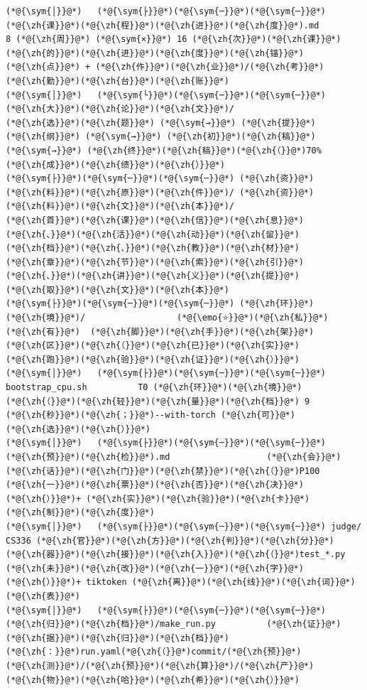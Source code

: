 \documentclass[
]{article}
\def\zh#1{{\zhfont #1}}
\def\sym#1{{\symfont #1}}
\def\emo#1{{\emofont #1}}
\begin{document}
\begin{lstlisting}
(*@{\sym{│}}@*)   (*@{\sym{├}}@*)(*@{\sym{─}}@*)(*@{\sym{─}}@*) (*@{\zh{课}}@*)(*@{\zh{程}}@*)(*@{\zh{进}}@*)(*@{\zh{度}}@*).md               8 (*@{\zh{周}}@*) (*@{\sym{×}}@*) 16 (*@{\zh{次}}@*)(*@{\zh{课}}@*)(*@{\zh{的}}@*)(*@{\zh{进}}@*)(*@{\zh{度}}@*)(*@{\zh{锚}}@*)(*@{\zh{点}}@*) + (*@{\zh{作}}@*)(*@{\zh{业}}@*)/(*@{\zh{考}}@*)(*@{\zh{勤}}@*)(*@{\zh{台}}@*)(*@{\zh{账}}@*)
(*@{\sym{│}}@*)   (*@{\sym{└}}@*)(*@{\sym{─}}@*)(*@{\sym{─}}@*) (*@{\zh{大}}@*)(*@{\zh{论}}@*)(*@{\zh{文}}@*)/                   (*@{\zh{选}}@*)(*@{\zh{题}}@*) (*@{\sym{→}}@*) (*@{\zh{提}}@*)(*@{\zh{纲}}@*) (*@{\sym{→}}@*) (*@{\zh{初}}@*)(*@{\zh{稿}}@*) (*@{\sym{→}}@*) (*@{\zh{终}}@*)(*@{\zh{稿}}@*)(*@{\zh{（}}@*)70% (*@{\zh{成}}@*)(*@{\zh{绩}}@*)(*@{\zh{）}}@*)
(*@{\sym{├}}@*)(*@{\sym{─}}@*)(*@{\sym{─}}@*) (*@{\zh{资}}@*)(*@{\zh{料}}@*)(*@{\zh{原}}@*)(*@{\zh{件}}@*)/ (*@{\zh{资}}@*)(*@{\zh{料}}@*)(*@{\zh{文}}@*)(*@{\zh{本}}@*)/           (*@{\zh{首}}@*)(*@{\zh{课}}@*)(*@{\zh{信}}@*)(*@{\zh{息}}@*)(*@{\zh{、}}@*)(*@{\zh{活}}@*)(*@{\zh{动}}@*)(*@{\zh{留}}@*)(*@{\zh{档}}@*)(*@{\zh{、}}@*)(*@{\zh{教}}@*)(*@{\zh{材}}@*)(*@{\zh{章}}@*)(*@{\zh{节}}@*)(*@{\zh{索}}@*)(*@{\zh{引}}@*)(*@{\zh{、}}@*)(*@{\zh{讲}}@*)(*@{\zh{义}}@*)(*@{\zh{提}}@*)(*@{\zh{取}}@*)(*@{\zh{文}}@*)(*@{\zh{本}}@*)
(*@{\sym{├}}@*)(*@{\sym{─}}@*)(*@{\sym{─}}@*) (*@{\zh{环}}@*)(*@{\zh{境}}@*)/                  (*@{\emo{⭐}}@*)(*@{\zh{私}}@*)(*@{\zh{有}}@*)  (*@{\zh{脚}}@*)(*@{\zh{手}}@*)(*@{\zh{架}}@*)(*@{\zh{区}}@*)(*@{\zh{（}}@*)(*@{\zh{已}}@*)(*@{\zh{实}}@*)(*@{\zh{跑}}@*)(*@{\zh{验}}@*)(*@{\zh{证}}@*)(*@{\zh{）}}@*)
(*@{\sym{│}}@*)   (*@{\sym{├}}@*)(*@{\sym{─}}@*)(*@{\sym{─}}@*) bootstrap_cpu.sh          T0 (*@{\zh{环}}@*)(*@{\zh{境}}@*)(*@{\zh{（}}@*)(*@{\zh{轻}}@*)(*@{\zh{量}}@*)(*@{\zh{档}}@*) 9 (*@{\zh{秒}}@*)(*@{\zh{；}}@*)--with-torch (*@{\zh{可}}@*)(*@{\zh{选}}@*)(*@{\zh{）}}@*)
(*@{\sym{│}}@*)   (*@{\sym{├}}@*)(*@{\sym{─}}@*)(*@{\sym{─}}@*) (*@{\zh{预}}@*)(*@{\zh{检}}@*).md                   (*@{\zh{会}}@*)(*@{\zh{话}}@*)(*@{\zh{门}}@*)(*@{\zh{禁}}@*)(*@{\zh{（}}@*)P100 (*@{\zh{一}}@*)(*@{\zh{票}}@*)(*@{\zh{否}}@*)(*@{\zh{决}}@*)(*@{\zh{）}}@*)+ (*@{\zh{实}}@*)(*@{\zh{验}}@*)(*@{\zh{卡}}@*)(*@{\zh{制}}@*)(*@{\zh{度}}@*)
(*@{\sym{│}}@*)   (*@{\sym{├}}@*)(*@{\sym{─}}@*)(*@{\sym{─}}@*) judge/                    CS336 (*@{\zh{官}}@*)(*@{\zh{方}}@*)(*@{\zh{判}}@*)(*@{\zh{分}}@*)(*@{\zh{器}}@*)(*@{\zh{接}}@*)(*@{\zh{入}}@*)(*@{\zh{（}}@*)test_*.py (*@{\zh{未}}@*)(*@{\zh{改}}@*)(*@{\zh{一}}@*)(*@{\zh{字}}@*)(*@{\zh{）}}@*)+ tiktoken (*@{\zh{离}}@*)(*@{\zh{线}}@*)(*@{\zh{词}}@*)(*@{\zh{表}}@*)
(*@{\sym{│}}@*)   (*@{\sym{├}}@*)(*@{\sym{─}}@*)(*@{\sym{─}}@*) (*@{\zh{归}}@*)(*@{\zh{档}}@*)/make_run.py          (*@{\zh{证}}@*)(*@{\zh{据}}@*)(*@{\zh{归}}@*)(*@{\zh{档}}@*)(*@{\zh{：}}@*)run.yaml(*@{\zh{（}}@*)commit/(*@{\zh{预}}@*)(*@{\zh{测}}@*)/(*@{\zh{预}}@*)(*@{\zh{算}}@*)/(*@{\zh{产}}@*)(*@{\zh{物}}@*)(*@{\zh{哈}}@*)(*@{\zh{希}}@*)(*@{\zh{）}}@*)

\end{lstlisting}
\end{document}
